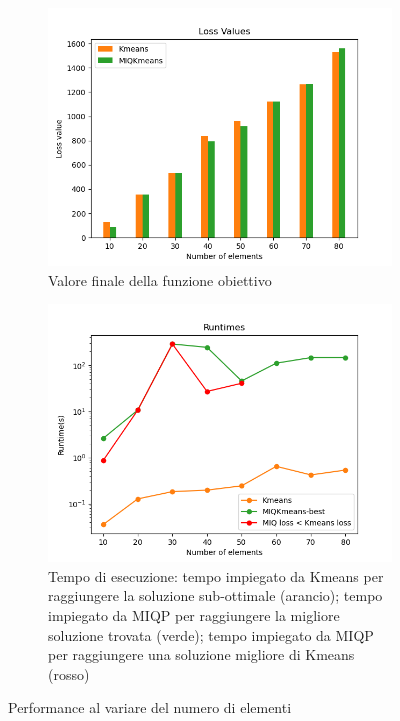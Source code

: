 \documentclass{article}
\begin{document}
    \begin{figure}[H]
     \centering
     \begin{subfigure}[t]{0.49\linewidth}
         \centering
         \includegraphics[width=\linewidth]{../results/log_plots/loss_size_sint}
         \caption{Valore finale della funzione obiettivo}
     \end{subfigure}
     \hfill
     \begin{subfigure}[t]{0.49\linewidth}
         \centering
         \includegraphics[width=\linewidth]{../results/log_plots/runtime_size_sint_log}
         \caption{Tempo di esecuzione: tempo impiegato da Kmeans per raggiungere la soluzione sub-ottimale (arancio); tempo impiegato da MIQP per raggiungere la migliore soluzione trovata (verde); tempo impiegato da MIQP per raggiungere una soluzione migliore di Kmeans (rosso)}
     \end{subfigure}
        \caption{Performance al variare del numero di elementi}
        \label{fig:size_sint}
     \end{figure}
\end{document}
